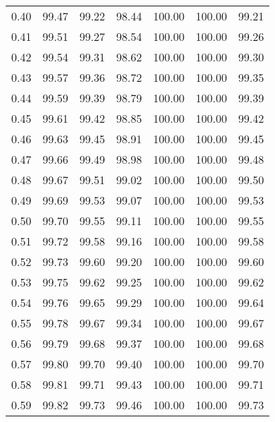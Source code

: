 \begin{tabular}{|c|c|c|c|c|c|c|}
      0.40 &     99.47 &     99.22 &      98.44 &  100.00 &     100.00 &         99.21 \\
      0.41 &     99.51 &     99.27 &      98.54 &  100.00 &     100.00 &         99.26 \\
      0.42 &     99.54 &     99.31 &      98.62 &  100.00 &     100.00 &         99.30 \\
      0.43 &     99.57 &     99.36 &      98.72 &  100.00 &     100.00 &         99.35 \\
      0.44 &     99.59 &     99.39 &      98.79 &  100.00 &     100.00 &         99.39 \\
      0.45 &     99.61 &     99.42 &      98.85 &  100.00 &     100.00 &         99.42 \\
      0.46 &     99.63 &     99.45 &      98.91 &  100.00 &     100.00 &         99.45 \\
      0.47 &     99.66 &     99.49 &      98.98 &  100.00 &     100.00 &         99.48 \\
      0.48 &     99.67 &     99.51 &      99.02 &  100.00 &     100.00 &         99.50 \\
      0.49 &     99.69 &     99.53 &      99.07 &  100.00 &     100.00 &         99.53 \\
      0.50 &     99.70 &     99.55 &      99.11 &  100.00 &     100.00 &         99.55 \\
      0.51 &     99.72 &     99.58 &      99.16 &  100.00 &     100.00 &         99.58 \\
      0.52 &     99.73 &     99.60 &      99.20 &  100.00 &     100.00 &         99.60 \\
      0.53 &     99.75 &     99.62 &      99.25 &  100.00 &     100.00 &         99.62 \\
      0.54 &     99.76 &     99.65 &      99.29 &  100.00 &     100.00 &         99.64 \\
      0.55 &     99.78 &     99.67 &      99.34 &  100.00 &     100.00 &         99.67 \\
      0.56 &     99.79 &     99.68 &      99.37 &  100.00 &     100.00 &         99.68 \\
      0.57 &     99.80 &     99.70 &      99.40 &  100.00 &     100.00 &         99.70 \\
      0.58 &     99.81 &     99.71 &      99.43 &  100.00 &     100.00 &         99.71 \\
      0.59 &     99.82 &     99.73 &      99.46 &  100.00 &     100.00 &         99.73 \\

\end{tabular}
